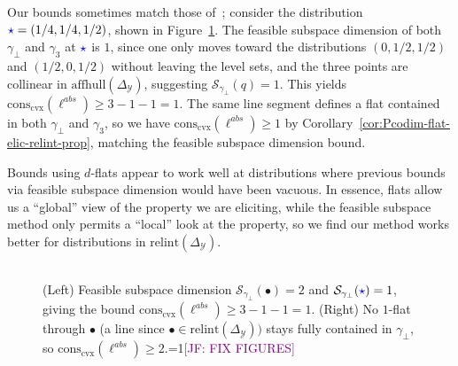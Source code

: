 \documentclass[11pt]{article} %
\newcommand{\Comments}{1}
\newcommand{\mynote}[2]{\ifnum\Comments=1\textcolor{#1}{#2}\fi}
\newcommand{\jessie}[1]{\mynote{purple}{[JF: #1]}}
\newcommand{\simplex}{\Delta_\Y}
\newcommand{\relint}[1]{\mathrm{relint}(#1)}
\newcommand{\conscvx}{\mathrm{cons}_\mathrm{cvx}}
\newcommand{\affhull}{\mathrm{affhull}}
\newcommand{\Sc}{\mathcal{S}}  %
\newcommand{\Y}{\mathcal{Y}}
\begin{document}
Our bounds sometimes match those of~\citep{ramaswamy2016convex}; consider the distribution ${\color{blue}\star} = (1/4, 1/4, 1/2)$, shown in Figure~\ref{fig:fsd-flats-abstain}.
The feasible subspace dimension of both $\gamma_\bot$ and $\gamma_3$ at ${\color{blue}\star}$ is $1$, since one only moves toward the distributions $(0,1/2, 1/2)$ and $(1/2, 0, 1/2)$ without leaving the level sets, and the three points are collinear in $\affhull(\simplex)$, suggesting $\Sc_{\gamma_\bot}(q) = 1$.  
This yields $\conscvx(\ell^{abs}) \geq 3 - 1- 1 = 1$.
The same line segment defines a flat contained in both $\gamma_\bot$ and $\gamma_3$, so we have $\conscvx(\ell^{abs}) \geq 1$ by Corollary~\ref{cor:Pcodim-flat-elic-relint-prop}, matching the feasible subspace dimension bound.

Bounds using $d$-flats appear to work well at distributions where previous bounds via feasible subspace dimension would have been vacuous.
In essence, flats allow us a ``global'' view of the property we are eliciting, while the feasible subspace method only permits a ``local'' look at the property, so we find our method works better for distributions in $\relint\simplex$.




\begin{figure}[htb]
	\centering
	\begin{tabular}{cc}
	\end{tabular}
	\caption{(Left) Feasible subspace dimension $\Sc_{\gamma_\bot}(\bullet) = 2$ and $\Sc_{\gamma_\bot}({\color{blue}\star}) = 1$, giving the bound $\conscvx(\ell^{abs}) \geq 3- 1-1 = 1$.
		(Right) No $1$-flat through $\bullet$ (a line since $\bullet \in \relint{\simplex})$  stays fully contained in $\gamma_\bot$, so $\conscvx(\ell^{abs}) \geq 2$.\jessie{FIX FIGURES}}
	\label{fig:fsd-flats-abstain}
\end{figure}
\end{document}
